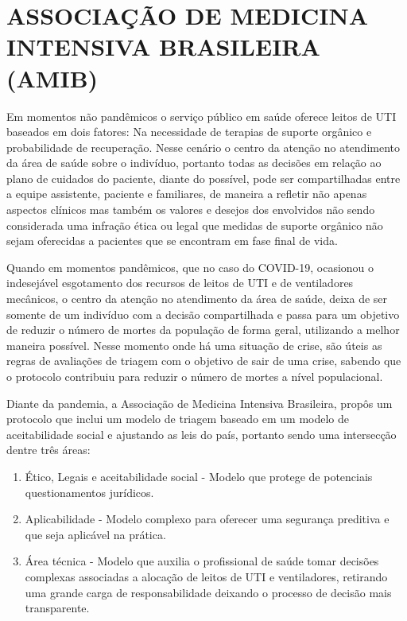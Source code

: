 \documentclass[12pt]{article}
\begin{document}
\section{ASSOCIAÇÃO DE MEDICINA INTENSIVA BRASILEIRA (AMIB)}

Em momentos não pandêmicos o serviço público em saúde oferece leitos de UTI baseados em dois fatores: Na necessidade de terapias de suporte orgânico e probabilidade de recuperação. Nesse cenário o centro da atenção no atendimento da área de saúde sobre o indivíduo, portanto todas as decisões em relação ao plano de cuidados do paciente, diante do possível, pode ser compartilhadas entre a equipe assistente, paciente e familiares, de maneira a refletir não apenas aspectos clínicos mas também os valores e desejos dos envolvidos não sendo considerada uma infração ética ou legal que medidas de suporte orgânico não sejam oferecidas a pacientes que se encontram em fase final de vida. 

Quando em momentos pandêmicos, que no caso do COVID-19, ocasionou o indesejável esgotamento dos recursos de leitos de UTI e de ventiladores mecânicos, o centro da atenção no atendimento da área de saúde, deixa de ser somente de um indivíduo com a decisão compartilhada e passa para um objetivo de reduzir o número de mortes da população de forma geral, utilizando a melhor maneira possível. Nesse momento onde há uma situação de crise, são úteis as regras de avaliações de triagem com o objetivo de sair de uma crise, sabendo que o protocolo contribuiu para reduzir o número de mortes a nível populacional.

Diante da pandemia, a Associação de Medicina Intensiva Brasileira, propôs um protocolo que inclui um modelo de triagem baseado em um modelo de aceitabilidade social \cite{biddison2019too} e ajustando as leis do país, portanto sendo uma intersecção dentre três áreas: 
\begin{enumerate}
    \item  Ético, Legais e aceitabilidade social - Modelo que protege de potenciais questionamentos jurídicos.
    \item Aplicabilidade - Modelo complexo para oferecer uma segurança preditiva e que seja aplicável na prática.
    \item Área técnica - Modelo que auxilia o profissional de saúde tomar decisões complexas associadas a alocação de leitos de UTI e ventiladores, retirando uma grande carga de responsabilidade deixando o processo de decisão mais transparente.
\end{enumerate}
\end{document}
